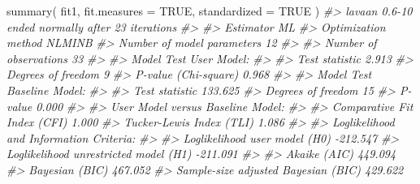 \documentclass[
  11pt,
]{krantz}
\makeatletter
\newenvironment{Shaded}{\begin{snugshade}}{\end{snugshade}}
\newcommand{\AttributeTok}[1]{\textcolor[rgb]{0.61,0.61,0.61}{#1}}
\newcommand{\CommentTok}[1]{\textcolor[rgb]{0.37,0.37,0.37}{\textit{#1}}}
\newcommand{\ConstantTok}[1]{\textcolor[rgb]{0,0,0}{#1}}
\newcommand{\FunctionTok}[1]{\textcolor[rgb]{0,0,0}{#1}}
\newcommand{\NormalTok}[1]{#1}
\newenvironment{kframe}{%
\medskip{}
\setlength{\fboxsep}{.8em}
 \def\at@end@of@kframe{}%
 \ifinner\ifhmode%
  \def\at@end@of@kframe{\end{minipage}}%
  \begin{minipage}{\columnwidth}%
 \fi\fi%
 \def\FrameCommand##1{\hskip\@totalleftmargin \hskip-\fboxsep
 \colorbox{shadecolor}{##1}\hskip-\fboxsep
     \hskip-\linewidth \hskip-\@totalleftmargin \hskip\columnwidth}%
 \MakeFramed {\advance\hsize-\width
   \@totalleftmargin\z@ \linewidth\hsize
   \@setminipage}}%
 {\par\unskip\endMakeFramed%
 \at@end@of@kframe}
\renewenvironment{Shaded}{\begin{kframe}}{\end{kframe}}
\theoremstyle{definition}
\theoremstyle{definition}
\theoremstyle{definition}
\theoremstyle{definition}
\theoremstyle{remark}
\makeatother
\begin{document}
\begin{Shaded}
\begin{Highlighting}[]
\FunctionTok{summary}\NormalTok{(}
\NormalTok{  fit1,}
  \AttributeTok{fit.measures =} \ConstantTok{TRUE}\NormalTok{,}
  \AttributeTok{standardized =} \ConstantTok{TRUE}
\NormalTok{)}
\CommentTok{\#\textgreater{} lavaan 0.6{-}10 ended normally after 23 iterations}
\CommentTok{\#\textgreater{} }
\CommentTok{\#\textgreater{}   Estimator                                         ML}
\CommentTok{\#\textgreater{}   Optimization method                           NLMINB}
\CommentTok{\#\textgreater{}   Number of model parameters                        12}
\CommentTok{\#\textgreater{}                                                       }
\CommentTok{\#\textgreater{}   Number of observations                            33}
\CommentTok{\#\textgreater{}                                                       }
\CommentTok{\#\textgreater{} Model Test User Model:}
\CommentTok{\#\textgreater{}                                                       }
\CommentTok{\#\textgreater{}   Test statistic                                 2.913}
\CommentTok{\#\textgreater{}   Degrees of freedom                                 9}
\CommentTok{\#\textgreater{}   P{-}value (Chi{-}square)                           0.968}
\CommentTok{\#\textgreater{} }
\CommentTok{\#\textgreater{} Model Test Baseline Model:}
\CommentTok{\#\textgreater{} }
\CommentTok{\#\textgreater{}   Test statistic                               133.625}
\CommentTok{\#\textgreater{}   Degrees of freedom                                15}
\CommentTok{\#\textgreater{}   P{-}value                                        0.000}
\CommentTok{\#\textgreater{} }
\CommentTok{\#\textgreater{} User Model versus Baseline Model:}
\CommentTok{\#\textgreater{} }
\CommentTok{\#\textgreater{}   Comparative Fit Index (CFI)                    1.000}
\CommentTok{\#\textgreater{}   Tucker{-}Lewis Index (TLI)                       1.086}
\CommentTok{\#\textgreater{} }
\CommentTok{\#\textgreater{} Loglikelihood and Information Criteria:}
\CommentTok{\#\textgreater{} }
\CommentTok{\#\textgreater{}   Loglikelihood user model (H0)               {-}212.547}
\CommentTok{\#\textgreater{}   Loglikelihood unrestricted model (H1)       {-}211.091}
\CommentTok{\#\textgreater{}                                                       }
\CommentTok{\#\textgreater{}   Akaike (AIC)                                 449.094}
\CommentTok{\#\textgreater{}   Bayesian (BIC)                               467.052}
\CommentTok{\#\textgreater{}   Sample{-}size adjusted Bayesian (BIC)          429.622}

\end{Highlighting}
\end{Shaded}
\end{document}
